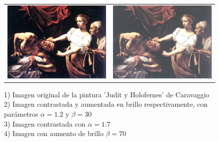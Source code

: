 \begin{landscape}
\begin{figure}[!h]
\begin{tabular}{cc}
			\includegraphics[width=12cm]{Imagenes/Contraste_contraste.png} & \includegraphics[width=12cm]{Imagenes/Contraste_brillo.png} 
		\end{tabular}
		\caption{1) Imagen original de la pintura 'Judit y Holofernes' de Caravaggio \\ 2) Imagen contrastada y aumentada en brillo respectivamente, con parámetros $\alpha = 1.2$ y $\beta = 30$ \\ 3) Imagen contrastada con $\alpha = 1.7$ \\ 4) Imagen con aumento de brillo $\beta = 70$}
	\end{figure}
\end{landscape}